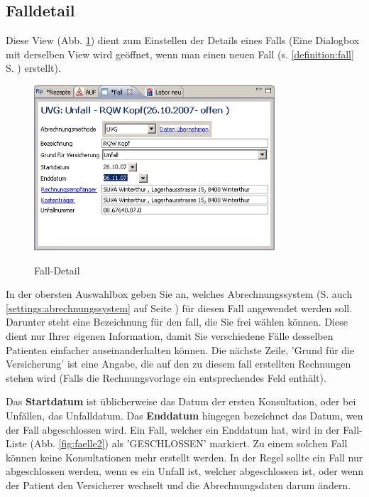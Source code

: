 \subsection{Falldetail}
\label{falldetail}
Diese View (Abb. \ref{fig:falldetail}) dient zum Einstellen der Details eines Falls (Eine Dialogbox mit derselben View wird geöffnet, wenn man einen neuen Fall (s. \ref{definition:fall} S. \pageref{definition:fall}) erstellt). 
\begin{figure}
  \includegraphics[width=0.8\textwidth]{images/falldetail}\\
  \caption{Fall-Detail}\label{fig:falldetail}
\end{figure}
In der obersten Auswahlbox geben Sie an, welches Abrechnungssystem (S. auch \ref{settings:abrechnungssystem} auf Seite \pageref{settings:abrechnungssystem}) für diesen Fall angewendet werden soll. Darunter steht eine Bezeichnung für den fall, die Sie frei wählen können. Diese dient nur Ihrer eigenen Information, damit Sie verschiedene Fälle desselben Patienten einfacher auseinanderhalten können. Die nächste Zeile, 'Grund für die Versicherung' ist eine Angabe, die auf den zu diesem fall erstellten Rechnungen stehen wird (Falls die Rechnungsvorlage ein entsprechendes Feld enthält).

Das \textbf{Startdatum} ist üblicherweise das Datum der ersten Konsultation, oder bei Unfällen, das Unfalldatum. Das \textbf{Enddatum} hingegen bezeichnet das Datum, wen der Fall abgeschlossen wird. Ein Fall, welcher ein Enddatum hat, wird in der Fall-Liste (Abb. \ref{fig:faelle2}) als 'GESCHLOSSEN' markiert. Zu einem solchen Fall können keine Konsultationen mehr erstellt werden.
In der Regel sollte ein Fall nur abgeschlossen werden, wenn es ein Unfall ist, welcher abgeschlossen ist, oder wenn der Patient den Versicherer wechselt und die Abrechnungsdaten darum ändern.

